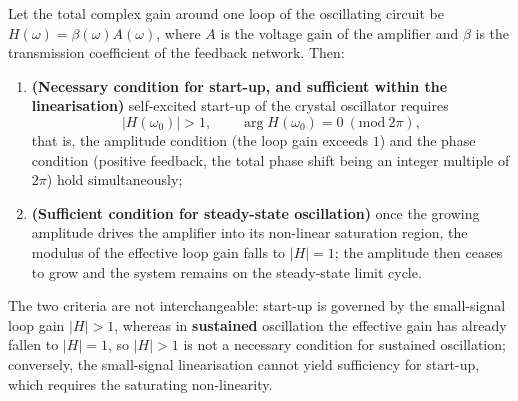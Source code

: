 \begin{lemma}\label{ch24_quartz_startup_lemma}
Let the total complex gain around one loop of the oscillating circuit be $H(\omega)=\beta(\omega)A(\omega)$, where $A$ is the voltage gain of the amplifier and $\beta$ is the transmission coefficient of the feedback network. Then:
\begin{enumerate}[label=(\roman*)]
    \item \textbf{(Necessary condition for start-up, and sufficient within the linearisation)} self-excited start-up of the crystal oscillator requires
\[
|H(\omega_0)| > 1, \qquad \arg H(\omega_0) = 0 \ (\text{mod}\ 2\pi),
\]
that is, the amplitude condition (the loop gain exceeds $1$) and the phase condition (positive feedback, the total phase shift being an integer multiple of $2\pi$) hold simultaneously;
    \item \textbf{(Sufficient condition for steady-state oscillation)} once the growing amplitude drives the amplifier into its non-linear saturation region, the modulus of the effective loop gain falls to $|H|=1$; the amplitude then ceases to grow and the system remains on the steady-state limit cycle.
\end{enumerate}
The two criteria are not interchangeable: start-up is governed by the small-signal loop gain $|H|>1$, whereas in \textbf{sustained} oscillation the effective gain has already fallen to $|H|=1$, so $|H|>1$ is not a necessary condition for sustained oscillation; conversely, the small-signal linearisation cannot yield sufficiency for start-up, which requires the saturating non-linearity.
\end{lemma}

